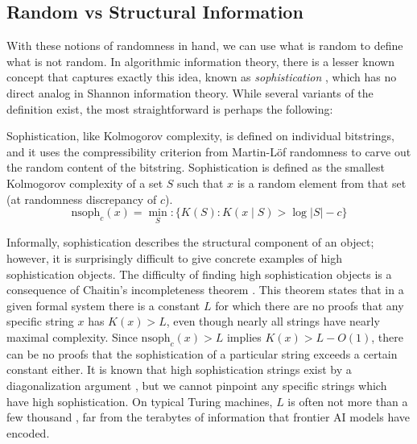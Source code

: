 \documentclass[twoside]{article}
\begin{document}
%
%
%
%

%
%

\subsection{Random vs Structural Information}
\label{sec:sophistication}

With these notions of randomness in hand, we can use what is random to define what is not random. In algorithmic information theory, there is a lesser known concept that captures exactly this idea, known as \emph{sophistication} \citep{koppel1987structure}, which has no direct analog in Shannon information theory. While several variants of the definition exist, the most straightforward is perhaps the following:
\begin{definition}\label{def:nsoph}
Sophistication, like Kolmogorov complexity, is defined on individual bitstrings, and it uses the compressibility criterion from Martin-L\"of randomness to carve out the random content of the bitstring. Sophistication is defined as the smallest Kolmogorov complexity of a set $S$ such that $x$ is a random element from that set (at randomness discrepancy of $c$).
\begin{equation}
    \mathrm{nsoph}_c(x) = \min_S: \{K(S): K(x\mid S)>\log |S|-c\}
\end{equation}
\end{definition}
Informally, sophistication describes the structural component of an object; however, it is surprisingly difficult to give concrete examples of high sophistication objects. %
The difficulty of finding high sophistication objects
is a consequence of Chaitin's incompleteness theorem \citep{chaitin1974information}. This theorem states that in a given formal system there is a constant $L$ for which there are no proofs that any specific string $x$ has $K(x)>L$, even though nearly all strings have nearly maximal complexity. Since $\mathrm{nsoph}_c(x)>L$ implies $K(x)>L-O(1)$, there can be no proofs that the sophistication of a particular string exceeds a certain constant either. It is known that high sophistication strings exist by a diagonalization argument \citep{antunes2006sophistication}, but we cannot pinpoint any specific strings which have high sophistication. 
%
On typical Turing machines, $L$ is often not more than a few thousand \citep{chaitin1998limits}, far from the terabytes of information that frontier AI models have encoded. %
\end{document}
